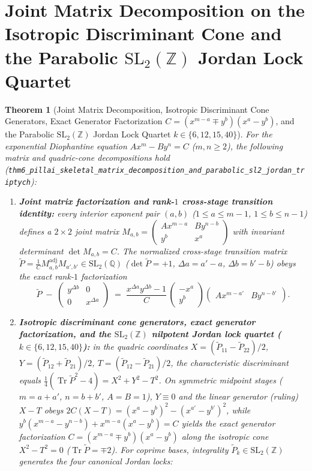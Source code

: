 \documentclass[11pt,a4paper]{article}
\theoremstyle{plain}
\newtheorem{theorem}{Theorem}[section]
\theoremstyle{definition}
\begin{document}
\section{Joint Matrix Decomposition on the Isotropic Discriminant Cone and the Parabolic \texorpdfstring{$\mathrm{SL}_2(\mathbb{Z})$}{SL2(Z)} Jordan Lock Quartet}
\label{sec:isotropic-cone}

\begin{theorem}[Joint Matrix Decomposition, Isotropic Discriminant Cone Generators, Exact Generator Factorization $C = (x^{m-a}\mp y^b)(x^a-y^b)$, and the Parabolic $\mathrm{SL}_2(\mathbb{Z})$ Jordan Lock Quartet $k\in\{6,12,15,40\}$]
\label{thm:main-6}
For the exponential Diophantine equation $A x^m - B y^n = C$ ($m,n\ge 2$), the following matrix and quadric-cone decompositions hold (\texttt{thm6\_pillai\_skeletal\_matrix\_decomposition\_and\_parabolic\_sl2\_jordan\_triptych}):
\begin{enumerate}[label=\textbf{(\roman*)},leftmargin=*]
\item \textbf{Joint matrix factorization and rank-$1$ cross-stage transition identity:}
  every interior exponent pair $(a,b)$ ($1\le a\le m-1$, $1\le b\le n-1$) defines a $2\times 2$ joint matrix $M_{a,b} = \begin{pmatrix} A x^{m-a} & B y^{n-b} \\ y^b & x^a \end{pmatrix}$ with invariant determinant $\det M_{a,b} = C$. The normalized cross-stage transition matrix $\widetilde{P} = \frac{1}{C} M_{a,b}^{\mathrm{adj}} M_{a',b'}\in\mathrm{SL}_2(\mathbb{Q})$ ($\det\widetilde{P} = +1$, $\Delta a = a'-a$, $\Delta b = b'-b$) obeys the exact rank-$1$ factorization
  \[
    \widetilde{P} \;-\; \begin{pmatrix} y^{\Delta b} & 0 \\ 0 & x^{\Delta a} \end{pmatrix}
    \;=\; \frac{x^{\Delta a}y^{\Delta b}-1}{C}\,\begin{pmatrix} -x^a \\ y^b \end{pmatrix}\begin{pmatrix} A x^{m-a'} & B y^{n-b'} \end{pmatrix}.
  \]
\item \textbf{Isotropic discriminant cone generators, exact generator factorization, and the $\mathrm{SL}_2(\mathbb{Z})$ nilpotent Jordan lock quartet ($k\in\{6,12,15,40\}$):}
  in the quadric coordinates $X = (\widetilde{P}_{11}-\widetilde{P}_{22})/2$, $Y = (\widetilde{P}_{12}+\widetilde{P}_{21})/2$, $T = (\widetilde{P}_{12}-\widetilde{P}_{21})/2$, the characteristic discriminant equals $\frac{1}{4}(\operatorname{Tr}\widetilde{P}^2 - 4) = X^2 + Y^2 - T^2$. On symmetric midpoint stages ($m=a+a'$, $n=b+b'$, $A=B=1$), $Y\equiv 0$ and the linear generator (ruling) $X - T$ obeys $2C(X - T) = (x^a - y^b)^2 - (x^{a'} - y^{b'})^2$, while $y^b(x^{m-a}-y^{n-b}) + x^{m-a}(x^a-y^b) = C$ yields the exact generator factorization $C = (x^{m-a}\mp y^b)(x^a - y^b)$ along the isotropic cone $X^2 - T^2 = 0$ ($\operatorname{Tr}\widetilde{P} = \mp 2$). For coprime bases, integrality $\widetilde{P}_k\in\mathrm{SL}_2(\mathbb{Z})$ generates the four canonical Jordan locks:

\end{enumerate}
\end{theorem}
\end{document}
